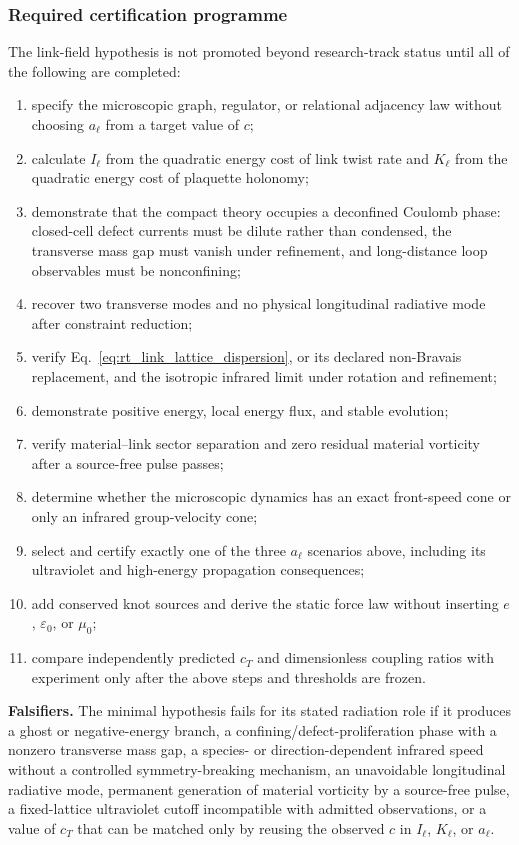 \subsubsection{Required certification programme}

The link-field hypothesis is not promoted beyond research-track status until all
of the following are completed:
\begin{enumerate}
    \item specify the microscopic graph, regulator, or relational adjacency law
    without choosing \(a_\ell\) from a target value of \(c\);
    \item calculate \(I_\ell\) from the quadratic energy cost of link twist rate
    and \(K_\ell\) from the quadratic energy cost of plaquette holonomy;
    \item demonstrate that the compact theory occupies a deconfined Coulomb phase:
    closed-cell defect currents must be dilute rather than condensed, the
    transverse mass gap must vanish under refinement, and long-distance loop
    observables must be nonconfining;
    \item recover two transverse modes and no physical longitudinal radiative
    mode after constraint reduction;
    \item verify Eq.~\eqref{eq:rt_link_lattice_dispersion}, or its declared
    non-Bravais replacement, and the isotropic infrared limit under rotation and
    refinement;
    \item demonstrate positive energy, local energy flux, and stable evolution;
    \item verify material--link sector separation and zero residual material
    vorticity after a source-free pulse passes;
    \item determine whether the microscopic dynamics has an exact front-speed
    cone or only an infrared group-velocity cone;
    \item select and certify exactly one of the three \(a_\ell\) scenarios above,
    including its ultraviolet and high-energy propagation consequences;
    \item add conserved knot sources and derive the static force law without
    inserting \(e\), \(\varepsilon_0\), or \(\mu_0\);
    \item compare independently predicted \(c_T\) and dimensionless coupling
    ratios with experiment only after the above steps and thresholds are frozen.
\end{enumerate}

\textbf{Falsifiers.}
The minimal hypothesis fails for its stated radiation role if it produces a ghost
or negative-energy branch, a confining/defect-proliferation phase with a nonzero
transverse mass gap, a species- or direction-dependent infrared speed without a
controlled symmetry-breaking mechanism, an unavoidable longitudinal radiative
mode, permanent generation of material vorticity by a source-free pulse, a
fixed-lattice ultraviolet cutoff incompatible with admitted observations, or a
value of \(c_T\) that can be matched only by reusing the observed \(c\) in
\(I_\ell\), \(K_\ell\), or \(a_\ell\).

